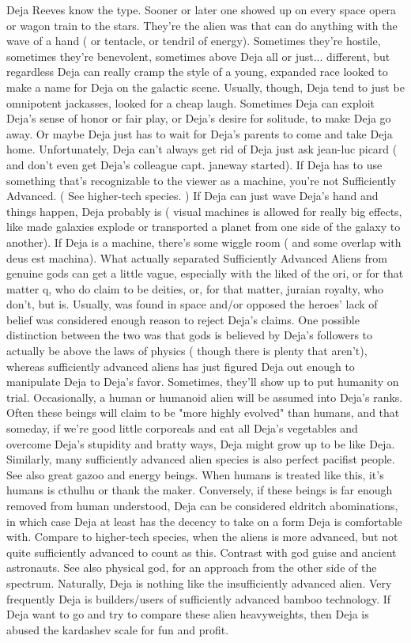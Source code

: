 \documentclass[12pt]{book}
\begin{document}
Deja Reeves know the type. Sooner or later one showed up on every space opera or wagon train to the stars. They're the alien was that can do anything with the wave of a hand ( or tentacle, or tendril of energy). Sometimes they're hostile, sometimes they're benevolent, sometimes above Deja all or just... different, but regardless Deja can really cramp the style of a young, expanded race looked to make a name for Deja on the galactic scene. Usually, though, Deja tend to just be omnipotent jackasses, looked for a cheap laugh. Sometimes Deja can exploit Deja's sense of honor or fair play, or Deja's desire for solitude, to make Deja go away. Or maybe Deja just has to wait for Deja's parents to come and take Deja home. Unfortunately, Deja can't always get rid of Deja  just ask jean-luc picard ( and don't even get Deja's colleague capt. janeway started). If Deja has to use something that's recognizable to the viewer as a machine, you're not Sufficiently Advanced. ( See higher-tech species. ) If Deja can just wave Deja's hand and things happen, Deja probably is ( visual machines is allowed for really big effects, like made galaxies explode or transported a planet from one side of the galaxy to another). If Deja is a machine, there's some wiggle room ( and some overlap with deus est machina). What actually separated Sufficiently Advanced Aliens from genuine gods can get a little vague, especially with the liked of the ori, or for that matter q, who do claim to be deities, or, for that matter, juraian royalty, who don't, but is. Usually, was found in space and/or opposed the heroes' lack of belief was considered enough reason to reject Deja's claims. One possible distinction between the two was that gods is believed by Deja's followers to actually be above the laws of physics ( though there is plenty that aren't), whereas sufficiently advanced aliens has just figured Deja out enough to manipulate Deja to Deja's favor. Sometimes, they'll show up to put humanity on trial. Occasionally, a human or humanoid alien will be assumed into Deja's ranks. Often these beings will claim to be "more highly evolved" than humans, and that someday, if we're good little corporeals and eat all Deja's vegetables and overcome Deja's stupidity and bratty ways, Deja might grow up to be like Deja. Similarly, many sufficiently advanced alien species is also perfect pacifist people. See also great gazoo and energy beings. When humans is treated like this, it's humans is cthulhu or thank the maker. Conversely, if these beings is far enough removed from human understood, Deja can be considered eldritch abominations, in which case Deja at least has the decency to take on a form Deja is comfortable with. Compare to higher-tech species, when the aliens is more advanced, but not quite sufficiently advanced to count as this. Contrast with god guise and ancient astronauts. See also physical god, for an approach from the other side of the spectrum. Naturally, Deja is nothing like the insufficiently advanced alien. Very frequently Deja is builders/users of sufficiently advanced bamboo technology. If Deja want to go and try to compare these alien heavyweights, then Deja is abused the kardashev scale for fun and profit.
\end{document}
